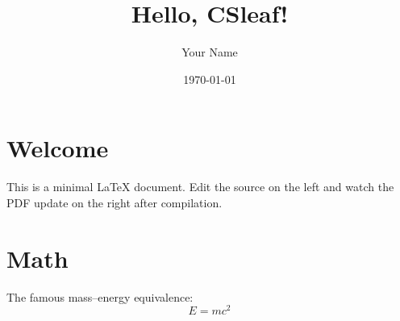 \documentclass{article}
\begin{document}
\title{Hello, CSleaf!}
\author{Your Name}
\date{\today}

\maketitle

\section{Welcome}
This is a minimal \LaTeX{} document. Edit the source on the left and watch
the PDF update on the right after compilation.

\section{Math}
The famous mass--energy equivalence:
\begin{equation}
  E = mc^2
\end{equation}
\end{document}
